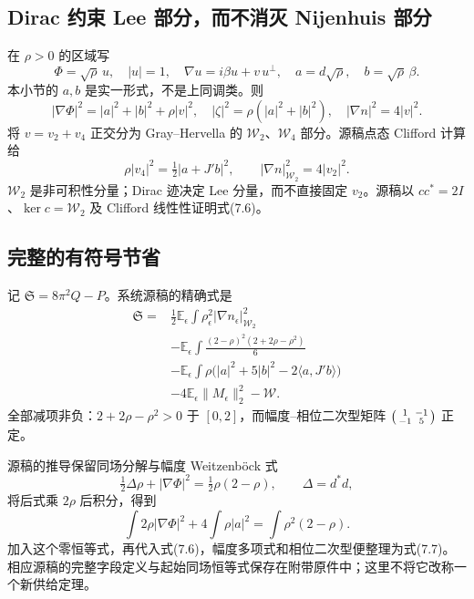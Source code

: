 \documentclass[UTF8,11pt,fontset=none]{ctexart}
\theoremstyle{definition}
\theoremstyle{remark}
\begin{document}
\subsection{Dirac 约束 Lee 部分，而不消灭 Nijenhuis 部分}\label{v7-dirac-ux7ea6ux675f-lee-ux90e8ux5206ux800cux4e0dux6d88ux706d-nijenhuis-ux90e8ux5206}

在 \(\rho>0\) 的区域写 \[
 \Phi=\sqrt\rho\,u,\quad |u|=1,\quad
 \nabla u=i\beta u+v\,u^\perp,
 \quad a=d\sqrt\rho,\quad b=\sqrt\rho\,\beta.
\] 本小节的 \(a,b\) 是实一形式，不是上同调类。则 \[
 |\nabla\Phi|^2=|a|^2+|b|^2+\rho|v|^2,
 \quad|\zeta|^2=\rho(|a|^2+|b|^2),\quad|\nabla n|^2=4|v|^2.
\] 将 \(v=v_2+v_4\) 正交分为 Gray--Hervella 的 \(\mathcal W_2\)、\(\mathcal W_4\) 部分。源稿点态 Clifford 计算给 \[
 \rho|v_4|^2=\tfrac12|a+J'b|^2,
 \qquad |\nabla n|_{\mathcal W_2}^2=4|v_2|^2.
\tag{7.6}
\] \(\mathcal W_2\) 是非可积性分量；Dirac 迹决定 Lee 分量，而不直接固定 \(v_2\)。源稿以 \(cc^*=2I\)、\(\ker c=\mathcal W_2\) 及 Clifford 线性性证明式(7.6)。

\subsection{完整的有符号节省}\label{v7-ux5b8cux6574ux7684ux6709ux7b26ux53f7ux8282ux7701}

记 \(\mathfrak S=8\pi^2Q-P\)。系统源稿的精确式是 \[
 \begin{aligned}
 \mathfrak S={}&\frac12\mathbb E_\epsilon\int
 \rho_\epsilon^2|\nabla n_\epsilon|_{\mathcal W_2}^2\\
 &-\mathbb E_\epsilon\int
 \frac{(2-\rho)^2(2+2\rho-\rho^2)}6\\
 &-\mathbb E_\epsilon\int
 \rho\bigl(|a|^2+5|b|^2-2\langle a,J'b\rangle\bigr)\\
 &-4\mathbb E_\epsilon\|M_\epsilon\|_2^2-\mathcal W.
 \end{aligned}
\tag{7.7}
\] 全部减项非负：\(2+2\rho-\rho^2>0\) 于 \([0,2]\)，而幅度--相位二次型矩阵 \(\begin{psmallmatrix}1&-1\\-1&5\end{psmallmatrix}\) 正定。

源稿的推导保留同场分解与幅度 Weitzenböck 式 \[
 \tfrac12\Delta\rho+|\nabla\Phi|^2=\tfrac12\rho(2-\rho),
 \qquad \Delta=d^*d,
\] 将后式乘 \(2\rho\) 后积分，得到 \[
 \int2\rho|\nabla\Phi|^2+4\int\rho|a|^2
 =\int\rho^2(2-\rho).
\] 加入这个零恒等式，再代入式(7.6)，幅度多项式和相位二次型便整理为式(7.7)。相应源稿的完整字段定义与起始同场恒等式保存在附带原件中；这里不将它改称一个新供给定理。\cite{B03}
\end{document}
